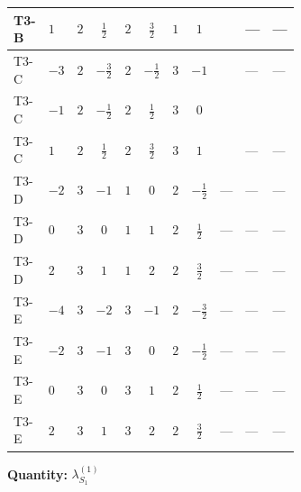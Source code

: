 \documentclass[8pt]{article}
\begin{document}
\begin{landscape}
\begin{longtable}{@{}llcccccc >{\raggedright\arraybackslash}p{0.21\linewidth} >{\raggedright\arraybackslash}p{0.21\linewidth} >{\raggedright\arraybackslash}p{0.21\linewidth}@{}}
\midrule
T3-B & $1$ & $2$ & $\frac{1}{2}$ & $2$ & $\frac{3}{2}$ & $1$ & $1$ & \scriptsize\adjustbox{max width=\linewidth}{$\begin{gathered} +\frac{{\lambda_{HS_1}^{(A)}}^2}{4}\end{gathered}$} & --- & --- \\
\midrule
T3-C & $-3$ & $2$ & $-\frac{3}{2}$ & $2$ & $-\frac{1}{2}$ & $3$ & $-1$ & \scriptsize\adjustbox{max width=\linewidth}{$\begin{gathered} +\frac{{\lambda_{HS_1}^{(A)}}^2}{4}\end{gathered}$} & --- & --- \\
\midrule
T3-C & $-1$ & $2$ & $-\frac{1}{2}$ & $2$ & $\frac{1}{2}$ & $3$ & $0$ & \scriptsize\adjustbox{max width=\linewidth}{$\begin{gathered} +\frac{{\lambda_{HS_1}^{(A)}}^2}{4}\end{gathered}$} & \scriptsize\adjustbox{max width=\linewidth}{$\begin{gathered} +{\lambda_{11}} (3 \operatorname{Tr}\!\left({y_1}\,\left({y_2}\right)^{\dagger}\right)+24 \left({\lambda_{11}}\right)^{*})\end{gathered}$} & \scriptsize\adjustbox{max width=\linewidth}{$\begin{gathered} +3 \left({\lambda_{11}}\right)^{*} \operatorname{Tr}\!\left({y_2}\,\left({y_1}\right)^{\dagger}\right)\end{gathered}$} \\
\midrule
T3-C & $1$ & $2$ & $\frac{1}{2}$ & $2$ & $\frac{3}{2}$ & $3$ & $1$ & \scriptsize\adjustbox{max width=\linewidth}{$\begin{gathered} +\frac{{\lambda_{HS_1}^{(A)}}^2}{4}\end{gathered}$} & --- & --- \\
\midrule
T3-D & $-2$ & $3$ & $-1$ & $1$ & $0$ & $2$ & $-\frac{1}{2}$ & --- & --- & --- \\
\midrule
T3-D & $0$ & $3$ & $0$ & $1$ & $1$ & $2$ & $\frac{1}{2}$ & --- & --- & --- \\
\midrule
T3-D & $2$ & $3$ & $1$ & $1$ & $2$ & $2$ & $\frac{3}{2}$ & --- & --- & --- \\
\midrule
T3-E & $-4$ & $3$ & $-2$ & $3$ & $-1$ & $2$ & $-\frac{3}{2}$ & --- & --- & --- \\
\midrule
T3-E & $-2$ & $3$ & $-1$ & $3$ & $0$ & $2$ & $-\frac{1}{2}$ & --- & --- & --- \\
\midrule
T3-E & $0$ & $3$ & $0$ & $3$ & $1$ & $2$ & $\frac{1}{2}$ & --- & --- & --- \\
\midrule
T3-E & $2$ & $3$ & $1$ & $3$ & $2$ & $2$ & $\frac{3}{2}$ & --- & --- & --- \\
\midrule
\bottomrule
\end{longtable}
\clearpage
\noindent\textbf{Quantity: }$\lambda_{S_1}^{(1)}$\par\smallskip

\end{landscape}
\end{document}
